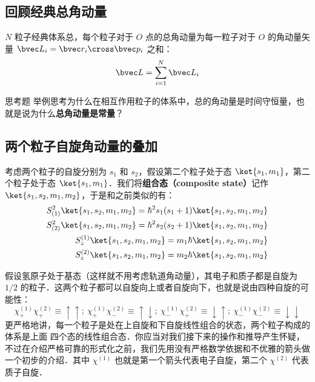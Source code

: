 \subsection{回顾经典总角动量}
$N$ 粒子经典体系总，每个粒子对于 $O$ 点的总角动量为每一粒子对于 $O$ 的角动量矢量 $\bvec L_i=\bvec r_i\cross\bvec p_i$ 之和：
\begin{equation}
\bvec L = \sum_{i=1}^N \bvec L_i
\end{equation}
\begin{exercise}{思考题}
举例思考为什么在相互作用粒子的体系中，总的角动量是时间守恒量，也就是说为什么\textbf{总角动量是常量}？
\end{exercise}
\subsection{两个粒子自旋角动量的叠加}
考虑两个粒子的自旋分别为 $s_1$ 和 $s_2$，假设第二个粒子处于态 $\ket{s_1,m_1}$，第二个粒子处于态 $\ket{s_1,m_1}$．我们将\textbf{组合态（composite state）}记作 $\ket{s_1,s_2,m_1,m_2}$，于是和之前类似的有：
\begin{align}
S_{(1)}^2\ket{s_1,s_2,m_1,m_2} = \hbar^2 s_1(s_1+1)\ket{s_1,s_2,m_1,m_2}\\
S_{(2)}^2\ket{s_1,s_2,m_1,m_2} = \hbar^2 s_2(s_2+1)\ket{s_1,s_2,m_1,m_2}\\
S^{(1)}_z\ket{s_1,s_2,m_1,m_2} = m_1\hbar\ket{s_1,s_2,m_1,m_2}\\
S^{(2)}_z\ket{s_1,s_2,m_1,m_2} = m_2\hbar\ket{s_1,s_2,m_1,m_2}
\end{align}

假设氢原子处于基态（这样就不用考虑轨道角动量），其电子和质子都是自旋为 $1/2$ 的粒子．这两个粒子都可以自旋向上或者自旋向下，也就是说由四种自旋的可能性：
\begin{equation}
\chi^{(1)}_+\chi^{(2)}_+\equiv\uparrow\uparrow;\ \chi^{(1)}_+\chi^{(2)}_-\equiv\uparrow\downarrow;\ \chi^{(1)}_-\chi^{(2)}_+\equiv\downarrow\uparrow;\ \chi^{(1)}_-\chi^{(2)}_-\equiv\downarrow\downarrow
\end{equation}
更严格地讲，每一个粒子是处在上自旋和下自旋线性组合的状态，两个粒子构成的体系是上面
四个态的线性组合态．你应当对我们接下来的操作和推导产生怀疑，不过在介绍严格可靠的形式化之前，我们先用没有严格数学依据和不优雅的箭头做一个初步的介绍．其中 $\chi^{(1)}$ 也就是第一个箭头代表电子自旋，第二个 $\chi^{(2)}$ 代表质子自旋．

